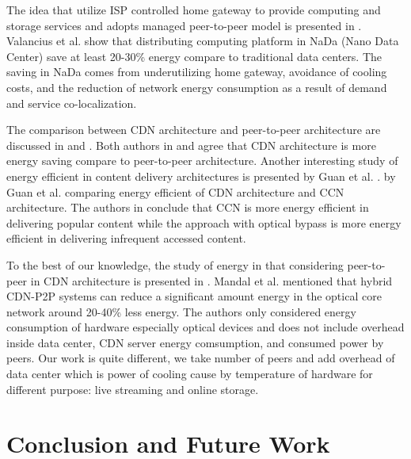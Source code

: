 \documentclass[JIP]{ipsj}
\begin{document}
The idea that utilize ISP controlled home gateway to provide computing and storage services and adopts managed peer-to-peer model is presented in \cite{valancius2009greening}. 
Valancius et al. \cite{valancius2009greening} show that distributing computing platform in NaDa (Nano Data Center) save at least 20-30\% energy compare to traditional data centers.
The saving in NaDa comes from underutilizing home gateway, avoidance of cooling costs, and the reduction of network energy consumption as a result of demand and service co-localization.

The comparison between CDN architecture and peer-to-peer architecture are discussed in \cite{baliga2007energy} and \cite{feldmann2010energy}.
Both authors in \cite{baliga2007energy} and \cite{feldmann2010energy} agree that CDN architecture is more energy saving compare to peer-to-peer architecture. 
Another interesting study of energy efficient in content delivery architectures is presented by Guan et al. \cite{5963557}.
by Guan et al. \cite{5963557} comparing energy efficient of CDN architecture and CCN architecture.
The authors in \cite{5963557} conclude that CCN is more energy efficient in delivering popular content while the approach with optical bypass is more energy efficient in delivering infrequent accessed content.

To the best of our knowledge, the study of energy in that considering peer-to-peer in CDN architecture is presented in \cite{6524219}.
Mandal et al. \cite{6524219} mentioned that hybrid CDN-P2P systems can reduce a significant amount energy in the optical core network around 20-40\% less energy.  
The authors only considered energy consumption of hardware especially optical devices and does not include overhead inside data center, CDN server energy comsumption, and consumed power by peers.
Our work is quite different, we take number of peers and add overhead of data center which is power of cooling cause by temperature of hardware for different purpose: live streaming and online storage.

\section{Conclusion and Future Work}\label{conclusion}
\end{document}
